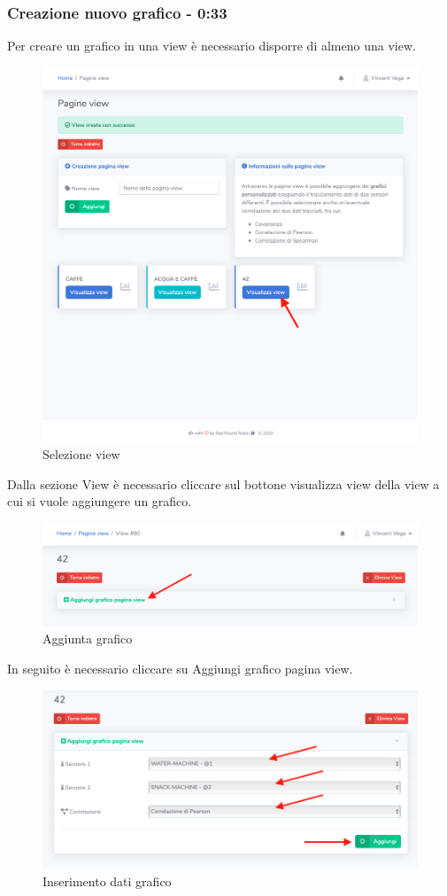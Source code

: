 	\subsubsection{Creazione nuovo grafico - 0:33}
		Per creare un grafico in una view è necessario disporre di almeno una view.
		\begin{figure}[H]
		\centering
		\includegraphics[scale=0.600]{res/images/membro/selView.png}
		\caption{Selezione view}
	\end{figure}
		Dalla sezione View è necessario cliccare sul bottone visualizza view della view a cui si vuole aggiungere un grafico.
		\begin{figure}[H]
		\centering
		\includegraphics[scale=0.600]{res/images/membro/clicAggGrafico.png}
		\caption{Aggiunta grafico}
	\end{figure}
		In seguito è necessario cliccare su Aggiungi grafico pagina view. 
		\begin{figure}[H]
		\centering
		\includegraphics[scale=0.600]{res/images/membro/insDatiGrafico.png}
		\caption{Inserimento dati grafico}
	\end{figure}
